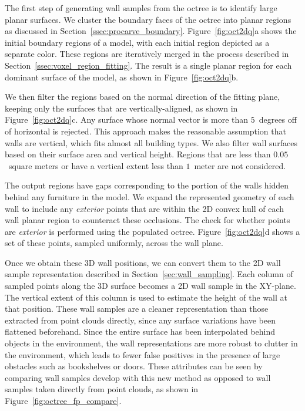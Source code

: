 \documentclass[12pt,onecolumn,oneside]{book}
\begin{document}
The first step of generating wall samples from the octree is to identify large planar surfaces.  We cluster the boundary faces of the octree into planar regions as discussed in Section~\ref{ssec:procarve_boundary}.  Figure~\ref{fig:oct2dq}a shows the initial boundary regions of a model, with each initial region depicted as a separate color.  These regions are iteratively merged in the process described in Section~\ref{ssec:voxel_region_fitting}.  The result is a single planar region for each dominant surface of the model, as shown in Figure~\ref{fig:oct2dq}b.  

We then filter the regions based on the normal direction of the fitting plane, keeping only the surfaces that are vertically-aligned, as shown in Figure~\ref{fig:oct2dq}c.  Any surface whose normal vector is more than $5$~degrees off of horizontal is rejected.  This approach makes the reasonable assumption that walls are vertical, which fits almost all building types.  We also filter wall surfaces based on their surface area and vertical height.  Regions that are less than $0.05$~square meters or have a vertical extent less than $1$~meter are not considered.

The output regions have gaps corresponding to the portion of the walls hidden behind any furniture in the model.  We expand the represented geometry of each wall to include any {\it exterior} points that are within the 2D convex hull of each wall planar region to counteract these occlusions.  The check for whether points are {\it exterior} is performed using the populated octree.  Figure~\ref{fig:oct2dq}d shows a set of these points, sampled uniformly, across the wall plane.  

Once we obtain these 3D wall positions, we can convert them to the 2D wall sample representation described in Section~\ref{sec:wall_sampling}.  Each column of sampled points along the 3D surface becomes a 2D wall sample in the XY-plane.  The vertical extent of this column is used to estimate the height of the wall at that position.  These wall samples are a cleaner representation than those extracted from point clouds directly, since any surface variations have been flattened beforehand.  Since the entire surface has been interpolated behind objects in the environment, the wall representations are more robust to clutter in the environment, which leads to fewer false positives in the presence of large obstacles such as bookshelves or doors.  These attributes can be seen by comparing wall samples develop with this new method as opposed to wall samples taken directly from point clouds, as shown in Figure~\ref{fig:octree_fp_compare}.
\end{document}
